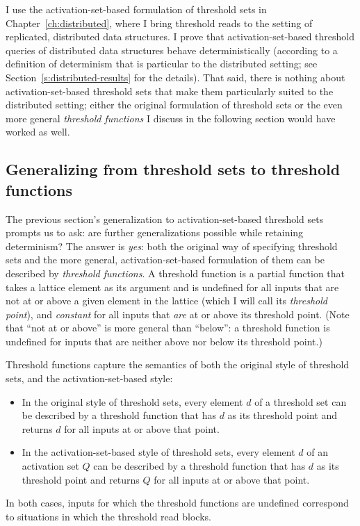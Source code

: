 \ifdefined\DISSERTATION
I use the activation-set-based formulation of threshold sets in
Chapter~\ref{ch:distributed}, where I bring threshold reads to the
setting of replicated, distributed data structures.  I prove that
activation-set-based threshold queries of distributed data structures
behave deterministically (according to a definition of determinism
that is particular to the distributed setting; see
Section~\ref{s:distributed-results} for the details).  That said,
there is nothing about activation-set-based threshold sets that make
them particularly suited to the distributed setting; either the
original formulation of threshold sets or the even more general
\emph{threshold functions} I discuss in the following section would
have worked as well.
\fi

\subsection{Generalizing from threshold sets to threshold functions}\label{subsection:lvars-generalizing-from-threshold-sets-to-threshold-functions}

The previous section's generalization to activation-set-based
threshold sets prompts us to ask: are further generalizations possible
while retaining determinism?  The answer is \emph{yes}: both the
original way of specifying threshold sets and the more general,
activation-set-based formulation of them can be described by
\emph{threshold functions}.  A threshold function is a partial
function that takes a lattice element as its argument and is undefined
for all inputs that are not at or above a given element in the lattice
(which I will call its \emph{threshold point}), and \emph{constant}
for all inputs that \emph{are} at or above its threshold point.  (Note
that ``not at or above'' is more general than ``below'': a threshold
function is undefined for inputs that are neither above nor below its
threshold point.)

Threshold functions capture the semantics of both the original
style of threshold sets, and the activation-set-based style:
\begin{itemize}
\item In the original style of threshold sets, every element $d$ of a
  threshold set can be described by a threshold function that has $d$
  as its threshold point and returns $d$ for all inputs at or above
  that point.
\item In the activation-set-based style of threshold sets, every
  element $d$ of an activation set $Q$ can be described by a threshold
  function that has $d$ as its threshold point and returns $Q$ for all
  inputs at or above that point.
\end{itemize}
In both cases, inputs for which the threshold functions are undefined
correspond to situations in which the threshold read blocks.

